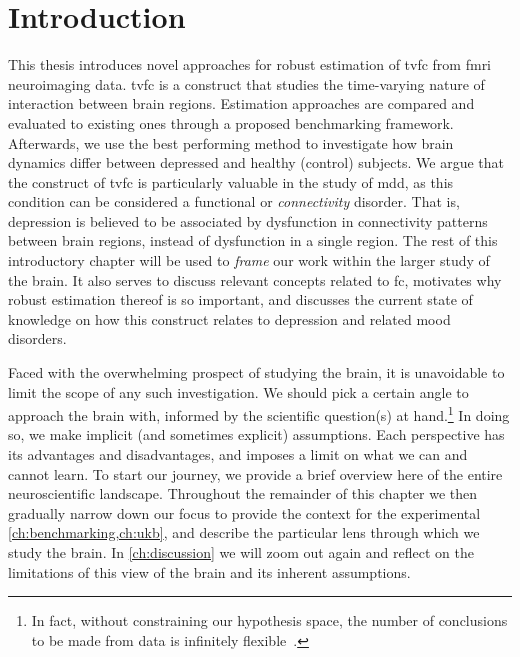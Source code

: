 \chapter{Introduction}\label{ch:introduction}

This thesis introduces novel approaches for robust estimation of \gls{tvfc} from \gls{fmri} neuroimaging data.
\Gls{tvfc} is a construct that studies the time-varying nature of interaction between brain regions.
Estimation approaches are compared and evaluated to existing ones through a proposed benchmarking framework.
%
Afterwards, we use the best performing method to investigate how brain dynamics differ between depressed and healthy (control) subjects.
We argue that the construct of \gls{tvfc} is particularly valuable in the study of \gls{mdd}, as this condition can be considered a functional or \emph{connectivity} disorder.
That is, depression is believed to be associated by dysfunction in connectivity patterns between brain regions, instead of dysfunction in a single region.
%
The rest of this introductory chapter will be used to \emph{frame} our work within the larger study of the brain.
It also serves to discuss relevant concepts related to \gls{fc}, motivates why robust estimation thereof is so important, and discusses the current state of knowledge on how this construct relates to depression and related mood disorders.

Faced with the overwhelming prospect of studying the brain, it is unavoidable to limit the scope of any such investigation.
We should pick a certain angle to approach the brain with, informed by the scientific question(s) at hand.\footnote{In fact, without constraining our hypothesis space, the number of conclusions to be made from data is infinitely flexible~\parencite[see also][]{Gershman2021}.}
In doing so, we make implicit (and sometimes explicit) assumptions.
Each perspective has its advantages and disadvantages, and imposes a limit on what we can and cannot learn.
To start our journey, we provide a brief overview here of the entire neuroscientific landscape.
Throughout the remainder of this chapter we then gradually narrow down our focus to provide the context for the experimental \cref{ch:benchmarking,ch:ukb}, and describe the particular lens through which we study the brain.
In \cref{ch:discussion} we will zoom out again and reflect on the limitations of this view of the brain and its inherent assumptions.


